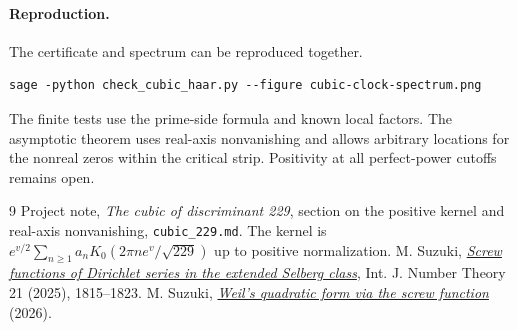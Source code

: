 \documentclass[11pt]{article}
\begin{document}
\paragraph{Reproduction.}
The certificate and spectrum can be reproduced together.
\begin{verbatim}
sage -python check_cubic_haar.py --figure cubic-clock-spectrum.png
\end{verbatim}
The finite tests use the prime-side formula and known local factors.
The asymptotic theorem uses real-axis nonvanishing and allows arbitrary
locations for the nonreal zeros within the critical strip.
Positivity at all perfect-power cutoffs remains open.

\begin{thebibliography}{9}
 Project note, \emph{The cubic of discriminant 229},
section on the positive kernel and real-axis nonvanishing,
\texttt{cubic\_229.md}. The kernel is
$e^{v/2}\sum_{n\ge1}a_n K_0(2\pi n e^v/\sqrt{229})$ up to positive normalization.
 M. Suzuki, \href{https://arxiv.org/abs/2209.12832}
{\emph{Screw functions of Dirichlet series in the extended Selberg class}},
Int. J. Number Theory 21 (2025), 1815--1823.
 M. Suzuki, \href{https://arxiv.org/abs/2606.09096}
{\emph{Weil's quadratic form via the screw function}} (2026).
\end{thebibliography}
\end{document}

